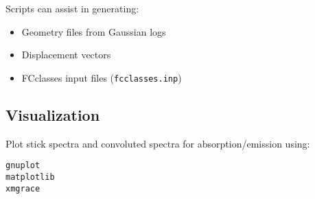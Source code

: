 Scripts can assist in generating:

\begin{itemize}
  \item Geometry files from Gaussian logs
  \item Displacement vectors
  \item FCclasses input files (\texttt{fcclasses.inp})
\end{itemize}

\subsection*{Visualization}

Plot stick spectra and convoluted spectra for absorption/emission using:

\begin{verbatim}
gnuplot
matplotlib
xmgrace
\end{verbatim}
